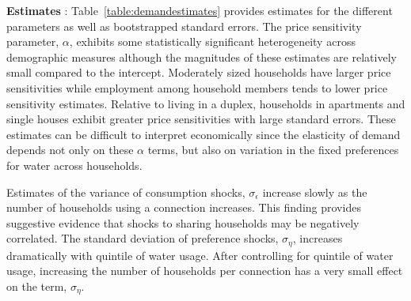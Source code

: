 \documentclass[12pt]{article}
\begin{document}
\textbf{Estimates} : Table~\ref{table:demandestimates} provides estimates for the different parameters as well as bootstrapped standard errors.  The price sensitivity parameter, $\alpha$, exhibits some statistically significant heterogeneity across demographic measures although the magnitudes of these estimates are relatively small compared to the intercept.  Moderately sized households have larger price sensitivities while employment among household members tends to lower price sensitivity estimates.  Relative to living in a duplex, households in apartments and single houses exhibit greater price sensitivities with large standard errors.  These estimates can be difficult to interpret economically since the elasticity of demand depends not only on these $\alpha$ terms, but also on variation in the fixed preferences for water across households.

Estimates of the variance of consumption shocks, $\sigma_{\epsilon}$ increase slowly as the number of households using a connection increases.  This finding provides suggestive evidence that shocks to sharing households may be negatively correlated.  The standard deviation of preference shocks, $\sigma_{\eta}$, increases dramatically with quintile of water usage.  After controlling for quintile of water usage, increasing the number of households per connection has a very small effect on the term, $\sigma_{\eta}$.
\end{document}

